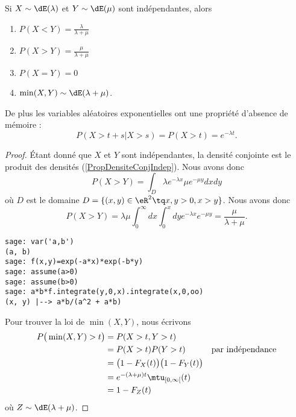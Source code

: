 \begin{proposition}
	Si \( X\sim\dE(\lambda)\) et \( Y\sim\dE(\mu)\) sont indépendantes, alors
	\begin{enumerate}
		\item
		      \( P(X<Y)=\frac{ \lambda }{ \lambda+\mu }\)
		\item
		      \( P(X>Y)=\frac{ \mu }{ \lambda+\mu }\)
		\item
		      \( P(X=Y)=0\)
		\item
		      \( \min(X,Y)\sim\dE(\lambda+\mu)\).
	\end{enumerate}
	De plus les variables aléatoires exponentielles ont une propriété d'absence de mémoire :
	\begin{equation}
		P(X>t+s|X>s)=P(X>t)= e^{-\lambda t}.
	\end{equation}
\end{proposition}

\begin{proof}
	Étant donné que \( X\) et \( Y\) sont indépendantes, la densité conjointe est le produit des densités (\ref{PropDensiteConjIndep}). Nous avons donc
	\begin{equation}
		P(X>Y)=\int_D\lambda e^{-\lambda x}\mu e^{-\mu y}dxdy
	\end{equation}
	où \( D\) est le domaine \( D=\{ (x,y)\in \eR^2\tq x,y>0, x>y \}\). Nous avons donc
	\begin{equation}
		P(X>Y)=\lambda\mu\int_0^{\infty}dx\int_0^xdy  e^{-\lambda x} e^{-\mu y}=\frac{ \mu }{ \lambda+\mu }.
	\end{equation}

	\begin{verbatim}
sage: var('a,b')
(a, b)
sage: f(x,y)=exp(-a*x)*exp(-b*y)
sage: assume(a>0)
sage: assume(b>0)
sage: a*b*f.integrate(y,0,x).integrate(x,0,oo)
(x, y) |--> a*b/(a^2 + a*b)
    \end{verbatim}

	Pour trouver la loi de \( \min(X,Y)\), nous écrivons
	\begin{subequations}
		\begin{align}
			P\big( \min(X,Y)>t \big) & =P(X>t,Y>t)                                                                                  \\
			                         & =P(X>t)P(Y>t)                                                      & \text{par indépendance} \\
			                         & =\big( 1-F_X(t) \big)\big( 1-F_Y(t) \big)                                                    \\
			                         & = e^{-(\lambda+\mu)t}\mtu_{\mathopen\lbrack 0 , \infty \lbrack}(t)                           \\
			                         & =1-F_Z(t)
		\end{align}
	\end{subequations}
	où \( Z\sim \dE(\lambda+\mu)\).
\end{proof}

